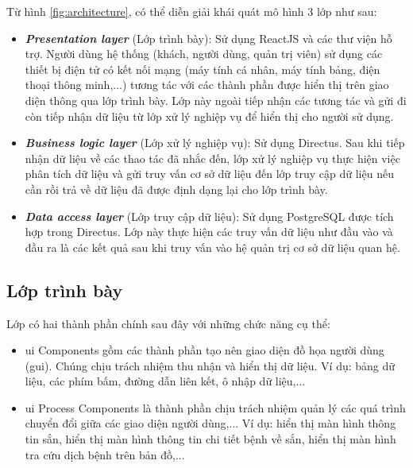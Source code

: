 \documentclass[./../main.tex]{subfiles}
\begin{document}
Từ hình \ref{fig:architecture}, có thể diễn giải khái quát mô hình 3 lớp như sau:
\begin{itemize}
    \item \textbf{\textit{Presentation layer}} (Lớp trình bày): Sử dụng ReactJS và các thư viện hỗ trợ. Người dùng hệ thống (khách, người dùng, quản trị viên) sử dụng các thiết bị điện tử có kết nối mạng (máy tính cá nhân, máy tính bảng, điện thoại thông minh,...) tương tác với các thành phần được hiển thị trên giao diện thông qua lớp trình bày. Lớp này ngoài tiếp nhận các tương tác và gửi đi còn tiếp nhận dữ liệu từ lớp xử lý nghiệp vụ để hiển thị cho người sử dụng.
    \item \textbf{\textit{Business logic layer}} (Lớp xử lý nghiệp vụ): Sử dụng Directus. Sau khi tiếp nhận dữ liệu về các thao tác đã nhắc đến, lớp xử lý nghiệp vụ thực hiện việc phân tích dữ liệu và gửi truy vấn cơ sở dữ liệu đến lớp truy cập dữ liệu nếu cần rồi trả về dữ liệu đã được định dạng lại cho lớp trình bày.
    \item \textbf{\textit{Data access layer}} (Lớp truy cập dữ liệu): Sử dụng PostgreSQL được tích hợp trong Directus. Lớp này thực hiện các truy vấn dữ liệu như đầu vào và đầu ra là các kết quả sau khi truy vấn vào hệ quản trị cơ sở dữ liệu quan hệ.
\end{itemize}

\subsection{Lớp trình bày}
Lớp có hai thành phần chính sau đây với những chức năng cụ thể:
\begin{itemize}
    \item \acrshort{ui} Components gồm các thành phần tạo nên giao diện đồ họa người dùng (\acrshort{gui}). Chúng chịu trách nhiệm thu nhận và hiển thị dữ liệu.
    Ví dụ: bảng dữ liệu, các phím bấm, đường dẫn liên kết, ô nhập dữ liệu,...
    \item \acrshort{ui} Process Components là thành phần chịu trách nhiệm quản lý các quá trình chuyển đổi giữa các giao diện người dùng,...
    Ví dụ: hiển thị màn hình thông tin sắn, hiển thị màn hình thông tin chi tiết bệnh về sắn, hiển thị màn hình tra cứu dịch bệnh trên bản đồ,...
\end{itemize}
\end{document}
